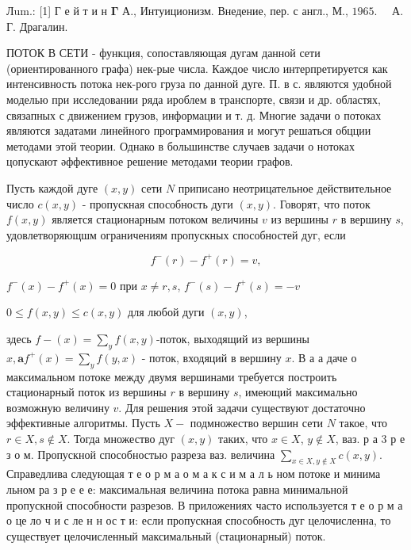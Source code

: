\documentclass[10pt]{article}
\begin{document}
Лum.: [1] Г е й т и н $\boldsymbol{\Gamma}$ А., Интуиционизм. Внедение, пер. с англ., М., $1965 . \quad$ А. Г. Драгалин.



ПОТОК В СЕТИ - функция, сопоставляющая дугам данной сети (ориентированного графа) нек-рые числа. Каждое число интерпретируется как интенсивность потока нек-рого груза по данной дуге. П. в с. являются удобной моделью при исследовании ряда ироблем в транспорте, связи и др. областях, связапных с движением грузов, информации и т. д. Многие задачи о потоках являются задатами линейного программирования и могут решаться обцции методами этой теории. Однако в большинстве случаев задачи о нотоках цопускают әффективное решение методами теории графов.



Пусть каждой дуге $(x, y)$ сети $N$ приписано неотрицательное действительное число $c(x, y)$ - пропускная способность дуги $(x, y)$. Говорят, что поток $f(x, y)$ является стационарным потоком величины $v$ из вершины $r$ в вершину $s$, удовлетворяющшм ограничениям пропускных способностей дуг, если



\[

f^{-}(r)-f^{+}(r)=v,

\]



$f^{-}(x)-f^{+}(x)=0$ при $x \neq r, s$, $f^{-}(s)-f^{+}(s)=-v$



$0 \leqslant f(x, y) \leqslant c(x, y)$ для любой дуги $(x, y)$,



здесь $f-(x)=\sum_{y} f(x, y)$-поток, выходящий из вершины $x, \mathbf{a} f^{+}(x)=\sum_{y} f(y, x)$ - поток, входяций в вершину $x$. В $а$ а даче о максимальном потоке между двумя вершинами требуется построить стационарный поток из вершины $r$ в вершину $s$, имеющий максимально возможную величину $v$. Для решения этой задачи существуют достаточно эффективные алгоритмы. Пусть $X-$ подмножество вершин сети $N$ такое, что $r \in X, s \notin X$. Тогда множество дуг $(x, y)$ таких, что $x \in X$, $y \notin X$, ваз. р а 3 р е з о м. Пропускной способностью разреза ваз. величина $\sum_{x \in X, y \notin X} c(x, y)$. Справедлива следующая т е о р м а о м а к с и м а л ь ном потоке и минима льном ра з р е е е: максимальная величина потока равна минимальной пропускной способности разрезов. В приложениях часто используется т е о р м а $о$ це ло ч и с ле н н ос т и: если пропускная способность дуг целочисленна, то существует целочисленный максимальный (стационарный) поток.
\end{document}
